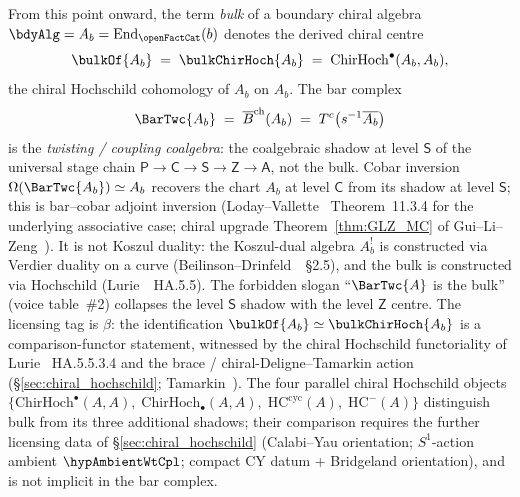 \providecommand{\IC}{\mathrm{IC}}

\begin{remark}
\label{rem:bar-vs-centre-canonical}%
%
%
%
From this point onward, the term \emph{bulk} of a boundary chiral
algebra $\bdyAlg = A_b = \mathrm{End}_{\openFactCat}(b)$
denotes the derived chiral centre
\[
 \bulkOf{A_b} \;=\; \bulkChirHoch{A_b}
 \;=\; \mathrm{ChirHoch}^{\bullet}(A_b, A_b),
\]
the chiral Hochschild cohomology of $A_b$ on $A_b$. The bar
complex
\[
 \BarTwc{A_b} \;=\; \overline{B}^{\mathrm{ch}}(A_b)
 \;=\; T^c\bigl(s^{-1}\overline{A_b}\bigr)
\]
is the \emph{twisting / coupling coalgebra}: the coalgebraic
shadow at level $\mathsf{S}$ of the universal stage chain
$\mathsf{P} \to \mathsf{C} \to \mathsf{S} \to \mathsf{Z} \to \mathsf{A}$,
not the bulk. Cobar inversion $\Omega(\BarTwc{A_b}) \simeq A_b$
recovers the chart $A_b$ at level $\mathsf{C}$ from its shadow at
level $\mathsf{S}$; this is bar--cobar adjoint
inversion (Loday--Vallette~\cite{LV12} Theorem~11.3.4 for the
underlying associative case; chiral upgrade
Theorem~\ref{thm:GLZ_MC} of Gui--Li--Zeng~\cite{GLZ22}). It is not
Koszul duality: the Koszul-dual algebra $A_b^!$ is constructed via
Verdier duality on a curve (Beilinson--Drinfeld~\cite{BD04}~\S2.5),
and the bulk is constructed via Hochschild
(Lurie~\cite{LurieHA}~HA.5.5).
The forbidden slogan ``$\BarTwc{A}$ is the bulk'' (voice
table~\#2) collapses the level $\mathsf{S}$ shadow with the
level $\mathsf{Z}$ centre. The licensing tag is $\beta$: the
identification $\bulkOf{A_b} \simeq \bulkChirHoch{A_b}$ is a
comparison-functor statement, witnessed by the chiral
Hochschild functoriality of Lurie~\cite{LurieHA} HA.5.5.3.4 and
the brace / chiral-Deligne--Tamarkin action
(\S\ref{sec:chiral_hochschild}; Tamarkin~\cite{Tamarkin2003}).
The four parallel chiral Hochschild objects
$\{\mathrm{ChirHoch}^{\bullet}(A, A),\;
\mathrm{ChirHoch}_{\bullet}(A, A),\;
\mathrm{HC}^{\mathrm{cyc}}(A),\;
\mathrm{HC}^{-}(A)\}$
distinguish bulk from its three additional shadows; their
comparison requires the further licensing data of
\S\ref{sec:chiral_hochschild} (Calabi--Yau orientation;
$S^1$-action ambient $\hypAmbientWtCpl$; compact CY datum + Bridgeland
orientation), and is not implicit in the bar complex.
\end{remark}

